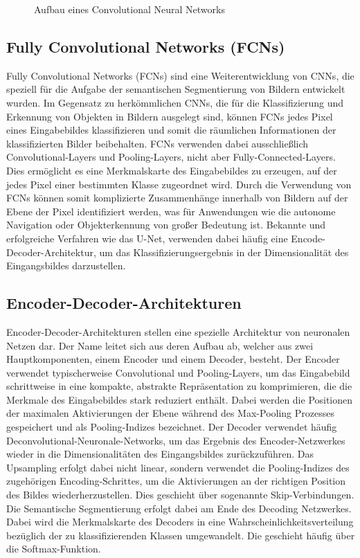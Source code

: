 \begin{figure}
    \centering
    
    \caption{Aufbau eines Convolutional Neural Networks}
    \label{fig:meinbild}
\end{figure}

\subsection{Fully Convolutional Networks (FCNs)}
Fully Convolutional Networks (FCNs) sind eine Weiterentwicklung von CNNs, die
speziell für die Aufgabe der semantischen Segmentierung von Bildern entwickelt
wurden. Im Gegensatz zu herkömmlichen CNNs, die für die Klassifizierung und
Erkennung von Objekten in Bildern ausgelegt sind, können FCNs jedes Pixel eines
Eingabebildes klassifizieren und somit die räumlichen Informationen der
klassifizierten Bilder beibehalten. FCNs verwenden dabei ausschließlich
Convolutional-Layers und Pooling-Layers, nicht aber Fully-Connected-Layers.
Dies ermöglicht es eine Merkmalskarte des Eingabebildes zu erzeugen, auf der
jedes Pixel einer bestimmten Klasse zugeordnet wird. Durch die Verwendung von
FCNs können somit komplizierte Zusammenhänge innerhalb von Bildern auf der
Ebene der Pixel identifiziert werden, was für Anwendungen wie die autonome
Navigation oder Objekterkennung von großer Bedeutung ist. \cite{7803544}
Bekannte und erfolgreiche Verfahren wie das U-Net, verwenden dabei häufig eine
Encode-Decoder-Architektur, um das Klassifizierungsergebnis in der
Dimensionalität des Eingangsbildes darzustellen.

\subsection{Encoder-Decoder-Architekturen}
Encoder-Decoder-Architekturen stellen eine spezielle Architektur von neuronalen
Netzen dar. Der Name leitet sich aus deren Aufbau ab, welcher aus zwei
Hauptkomponenten, einem Encoder und einem Decoder, besteht. Der Encoder
verwendet typischerweise Convolutional und Pooling-Layers, um das Eingabebild
schrittweise in eine kompakte, abstrakte Repräsentation zu komprimieren, die
die Merkmale des Eingabebildes stark reduziert enthält. Dabei werden die
Positionen der maximalen Aktivierungen der Ebene während des Max-Pooling
Prozesses gespeichert und als Pooling-Indizes bezeichnet. Der Decoder verwendet
häufig Deconvolutional-Neuronale-Networks, um das Ergebnis des
Encoder-Netzwerkes wieder in die Dimensionalitäten des Eingangsbildes
zurückzuführen. Das Upsampling erfolgt dabei nicht linear, sondern verwendet
die Pooling-Indizes des zugehörigen Encoding-Schrittes, um die Aktivierungen an
der richtigen Position des Bildes wiederherzustellen. Dies geschieht über
sogenannte Skip-Verbindungen. Die Semantische Segmentierung erfolgt dabei am
Ende des Decoding Netzwerkes. Dabei wird die Merkmalskarte des Decoders in eine
Wahrscheinlichkeitsverteilung bezüglich der zu klassifizierenden Klassen
umgewandelt. Die geschieht häufig über die Softmax-Funktion. \cite{7803544}

